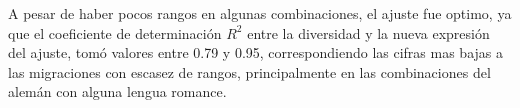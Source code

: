 A pesar de haber pocos rangos en algunas combinaciones, el ajuste fue optimo, ya que el coeficiente de determinación $R^{2}$ entre la diversidad y la nueva expresión del ajuste, tomó valores entre 0.79 y 0.95, correspondiendo las cifras mas bajas a las migraciones con escasez de rangos, principalmente en las combinaciones  del alemán con alguna lengua romance.  



